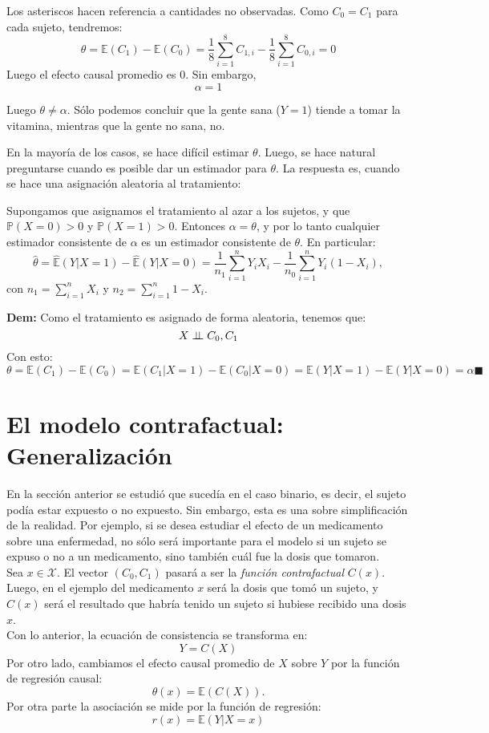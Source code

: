Los asteriscos hacen referencia a cantidades no observadas. Como $C_0=C_1$ para cada sujeto, tendremos: 
$$
\theta= \mathbb{E}(C_1)- \mathbb{E}(C_0)= \dfrac{1}{8} \sum_{i=1}^{8}C_{1,i}-\dfrac{1}{8} \sum_{i=1}^{8}C_{0,i}=0
$$
Luego el efecto causal promedio es $0$. Sin embargo, 
$$
\alpha= 1
$$

Luego $\theta \not = \alpha$. Sólo podemos concluir que la gente sana ($Y=1$) tiende a tomar la vitamina, mientras que la gente no sana, no.

En la mayoría de los casos, se hace difícil estimar $\theta$. Luego, se hace natural preguntarse cuando es posible dar un estimador para $\theta$. La respuesta es, cuando se hace una asignación aleatoria al tratamiento: 

\theorem Supongamos que asignamos el tratamiento al azar a los sujetos, y que $\mathbb{P}(X=0)>0$ y $\mathbb{P}(X=1)>0$. Entonces $\alpha = \theta$, y por lo tanto cualquier estimador consistente de $\alpha$ es un estimador consistente de $\theta$. 
En particular: 
$$
\hat{\theta}= \hat{\mathbb{E}}(Y|X=1)- \hat{\mathbb{E}}(Y|X=0) = \dfrac{1}{n_1} \sum_{i=1}^{n}Y_i X_i - \dfrac{1}{n_0} \sum_{i=1}^{n}Y_i (1-X_i),
$$
con $n_1= \sum_{i=1}^{n}X_i$ y $n_2=\sum_{i=1}^{n}1-X_i$. 

\textbf{Dem:} Como el tratamiento es asignado de forma aleatoria, tenemos que: 
$$
X \perp \!\!\! \perp C_0, C_1
$$
Con esto: 
$$
\theta=\mathbb{E}(C_1)-\mathbb{E}(C_0) = \mathbb{E}(C_1|X=1) - \mathbb{E}(C_0|X=0) = \mathbb{E}(Y|X=1) - \mathbb{E}(Y|X=0) = \alpha \blacksquare
$$ 

\section{El modelo contrafactual: Generalización}
En la sección anterior se estudió que sucedía en el caso binario, es decir, el sujeto podía estar expuesto o no expuesto. Sin embargo, esta es una sobre simplificación de la realidad. Por ejemplo, si se desea estudiar el efecto de un medicamento sobre una enfermedad, no sólo será importante para el modelo si un sujeto se expuso o no a un medicamento, sino también cuál fue la dosis que tomaron. \\
Sea $x \in \mathcal{X}$. El vector $(C_0,C_1)$ pasará a ser la  \textit{función contrafactual} $C(x)$. Luego, en el ejemplo del medicamento $x$ será la dosis que tomó un sujeto, y $C(x)$ será el resultado que habría tenido un sujeto si hubiese recibido una dosis $x$. \\
Con lo anterior, la ecuación de consistencia se transforma en: 
$$
Y=C(X)
$$
Por otro lado, cambiamos el efecto causal promedio de $X$ sobre $Y$ por la función de regresión causal: 
$$
\theta(x)= \mathbb{E}(C(X)).
$$
Por otra parte la asociación se mide por la función de regresión: 
$$
r(x)=\mathbb{E}(Y|X=x)
$$

